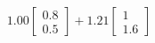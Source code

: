 \documentclass[preview]{standalone}
\begin{document}
\begin{align*}
1.00 \begin{bmatrix} 0.8 \\ 0.5 \end{bmatrix} + 1.21 \begin{bmatrix} 1 \\ 1.6 \end{bmatrix}
\end{align*}
\end{document}
